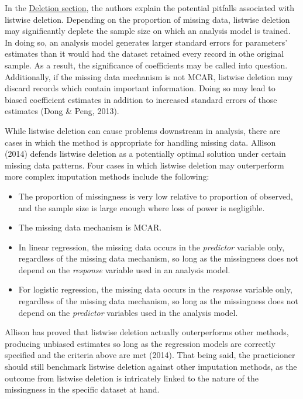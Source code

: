 \documentclass[12pt,oneside]{chicagocapstone}
\providecommand{\tightlist}{%
  \setlength{\itemsep}{0pt}\setlength{\parskip}{0pt}}
\begin{document}
In the \protect\hyperlink{background-deletion}{Deletion section}, the
authors explain the potential pitfalls associated with listwise
deletion. Depending on the proportion of missing data, listwise deletion
may significantly deplete the sample size on which an analysis model is
trained. In doing so, an analysis model generates larger standard errors
for parameters' estimates than it would had the dataset retained every
record in othe original sample. As a result, the significance of
coefficients may be called into question. Additionally, if the missing
data mechanism is not MCAR, listwise deletion may discard records which
contain important information. Doing so may lead to biased coefficient
estimates in addition to increased standard errors of those estimates
(Dong \& Peng, 2013).

While listwise deletion can cause problems downstream in analysis, there
are cases in which the method is appropriate for handling missing data.
Allison (2014) defends listwise deletion as a potentially optimal
solution under certain missing data patterns. Four cases in which
listwise deletion may outerperform more complex imputation methods
include the following:
\begin{itemize}
\tightlist
\item
  The proportion of missingness is very low relative to proportion of
  observed, and the sample size is large enough where loss of power is
  negligible.
\item
  The missing data mechanism is MCAR.
\item
  In linear regression, the missing data occurs in the \emph{predictor}
  variable only, regardless of the missing data mechanism, so long as
  the missingness does not depend on the \emph{response} variable used
  in an analysis model.
\item
  For logistic regression, the missing data occurs in the
  \emph{response} variable only, regardless of the missing data
  mechanism, so long as the missingness does not depend on the
  \emph{predictor} variables used in the analysis model.
\end{itemize}
Allison has proved that listwise deletion actually outerperforms other
methods, producing unbiased estimates so long as the regression models
are correctly specified and the criteria above are met (2014). That
being said, the practicioner should still benchmark listwise deletion
against other imputation methods, as the outcome from listwise deletion
is intricately linked to the nature of the missingness in the specific
dataset at hand.
\end{document}
